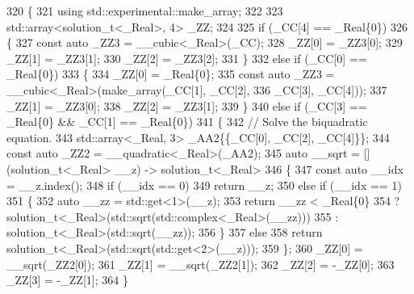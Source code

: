 \begin{DoxyCode}
320     \{
321       \textcolor{keyword}{using} std::experimental::make\_array;
322 
323       std::array<solution\_t<\_Real>, 4> \_ZZ;
324 
325       \textcolor{keywordflow}{if} (\_CC[4] == \_Real\{0\})
326         \{
327           \textcolor{keyword}{const} \textcolor{keyword}{auto} \_ZZ3 = \_\_cubic<\_Real>(\_CC);
328           \_ZZ[0] = \_ZZ3[0];
329           \_ZZ[1] = \_ZZ3[1];
330           \_ZZ[2] = \_ZZ3[2];
331         \}
332       \textcolor{keywordflow}{else} \textcolor{keywordflow}{if} (\_CC[0] == \_Real\{0\})
333         \{
334           \_ZZ[0] = \_Real\{0\};
335           \textcolor{keyword}{const} \textcolor{keyword}{auto} \_ZZ3 = \_\_cubic<\_Real>(make\_array(\_CC[1], \_CC[2],
336                                                       \_CC[3], \_CC[4]));
337           \_ZZ[1] = \_ZZ3[0];
338           \_ZZ[2] = \_ZZ3[1];
339         \}
340       \textcolor{keywordflow}{else} \textcolor{keywordflow}{if} (\_CC[3] == \_Real\{0\} && \_CC[1] == \_Real\{0\})
341         \{
342           \textcolor{comment}{// Solve the biquadratic equation.}
343           std::array<\_Real, 3> \_AA2\{\{\_CC[0], \_CC[2], \_CC[4]\}\};
344           \textcolor{keyword}{const} \textcolor{keyword}{auto} \_ZZ2 = \_\_quadratic<\_Real>(\_AA2);
345           \textcolor{keyword}{auto} \_\_sqrt = [](solution\_t<\_Real> \_\_z) -> solution\_t<\_Real>
346                         \{
347                           \textcolor{keyword}{const} \textcolor{keyword}{auto} \_\_idx = \_\_z.index();
348                           \textcolor{keywordflow}{if} (\_\_idx == 0)
349                             \textcolor{keywordflow}{return} \_\_z;
350                           \textcolor{keywordflow}{else} \textcolor{keywordflow}{if} (\_\_idx == 1)
351                             \{
352                               \textcolor{keyword}{auto} \_\_zz = std::get<1>(\_\_z);
353                               \textcolor{keywordflow}{return} \_\_zz < \_Real\{0\}
354                                    ? solution\_t<\_Real>(std::sqrt(std::complex<\_Real>(\_\_zz)))
355                                    : solution\_t<\_Real>(std::sqrt(\_\_zz));
356                             \}
357                           \textcolor{keywordflow}{else}
358                             \textcolor{keywordflow}{return} solution\_t<\_Real>(std::sqrt(std::get<2>(\_\_z)));
359                         \};
360           \_ZZ[0] = \_\_sqrt(\_ZZ2[0]);
361           \_ZZ[1] = \_\_sqrt(\_ZZ2[1]);
362           \_ZZ[2] = -\_ZZ[0];
363           \_ZZ[3] = -\_ZZ[1];
364         \}

\end{DoxyCode}
